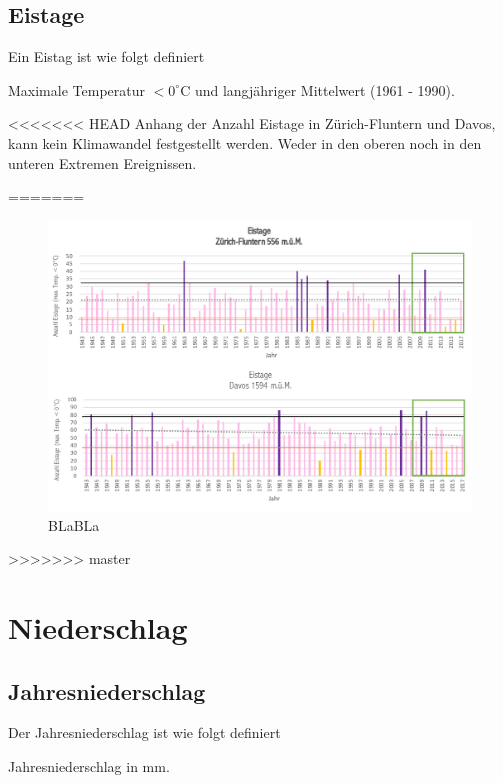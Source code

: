 \begin{refsection}
\subsection{Eistage}
Ein Eistag ist wie folgt definiert

\begin{definition}
Maximale Temperatur $< 0^{\circ}$C und langjähriger Mittelwert (1961 - 1990).
\end{definition}

<<<<<<< HEAD
Anhang der Anzahl Eistage in Zürich-Fluntern und Davos, kann kein Klimawandel festgestellt werden. Weder in den oberen noch in den unteren Extremen Ereignissen.

=======
\begin{figure}[htbp]
\centering
\includegraphics[width=1.0\textwidth]{extrem/Eistage.pdf}
\caption{BLaBLa}
\label{Eistage}
\end{figure}
>>>>>>> master

\section{Niederschlag}


\subsection{Jahresniederschlag}
Der Jahresniederschlag ist wie folgt definiert

\begin{definition}
Jahresniederschlag in mm.
\end{definition}


\end{refsection}
